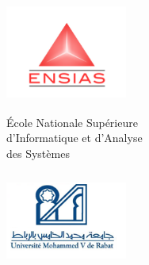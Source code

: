 \documentclass[12pt,a4paper]{report}
\makeatletter
\newcommand\frontmatter{%
	\cleardoublepage
	\pagenumbering{roman}}
\makeatother
\begin{document}
	\frontmatter
	\pagestyle{fancy}
	\fancyhf{}
	\fancyhf[HR]{\thepage}
	\fancyhf[HL]{\leftmark}
	\hyphenation{}
	
	
	\begin{titlepage}
		
		\begin{center}


		\begin{minipage}{0.5\textwidth}

		\begin{flushleft}
		\includegraphics[width=4cm,height=3.2cm]{graphics/ensias.png}\\
		\begin{flushleft}
		 { \scriptsize  \'Ecole Nationale Supérieure \\[0.2cm]d’Informatique et d’Analyse\\ \hspace{10mm}des Systèmes  }

		\end{flushleft}

		 

		\end{flushleft}

		\end{minipage}
		\begin{minipage}{0.4\textwidth}
		\begin{flushright}
		\includegraphics[width=4cm,height=3.2cm]{graphics/univ.png}\\
		\end{flushright}


\end{minipage}
\end{center}
\end{titlepage}
\end{document}
